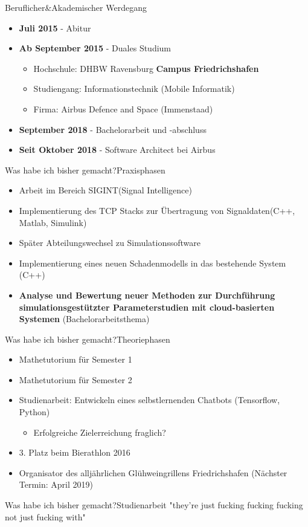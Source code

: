 	\begin{frame}{Beruflicher\&Akademischer Werdegang}{}
		\begin{itemize}
			\item \textbf{Juli 2015} - Abitur
			\item \textbf{Ab September 2015} - Duales Studium
			\begin{itemize}
				\item Hochschule: DHBW Ravensburg \textbf{Campus Friedrichshafen}
				\item Studiengang: Informationstechnik (Mobile Informatik)
				\item Firma: Airbus Defence and Space (Immenstaad)
			\end{itemize}
			\item \textbf{September 2018} - Bachelorarbeit und -abschluss
			\item \textbf{Seit Oktober 2018} - Software Architect bei Airbus
		\end{itemize}
	\end{frame}
	
	\begin{frame}{Was habe ich bisher gemacht?}{Praxisphasen}
			\begin{itemize}
				\item Arbeit im Bereich SIGINT(Signal Intelligence)
				\item Implementierung des TCP Stacks zur Übertragung von Signaldaten(C++, Matlab, Simulink)
				\item Später Abteilungswechsel zu Simulationssoftware
				\item Implementierung eines neuen Schadenmodells in das bestehende System (C++)
				\item \textbf{Analyse und Bewertung neuer Methoden zur Durchführung simulationsgestützter Parameterstudien mit cloud-basierten Systemen} (Bachelorarbeitsthema)
			\end{itemize}
	\end{frame}
	
	\begin{frame}{Was habe ich bisher gemacht?}{Theoriephasen}
		\begin{itemize}
			\item Mathetutorium für Semester 1
			\item Mathetutorium für Semester 2
			\item Studienarbeit: Entwickeln eines selbstlernenden Chatbots (Tensorflow, Python)
			\begin{itemize}
				\item Erfolgreiche Zielerreichung fraglich?
			\end{itemize}
			\item 3. Platz beim Bierathlon 2016
			\item Organisator des alljährlichen Glühweingrillens Friedrichshafen (Nächster Termin: April 2019)
		\end{itemize}
	\end{frame}
	
	\begin{frame}{Was habe ich bisher gemacht?}{Studienarbeit}
		"they're just fucking fucking fucking not just fucking with"
	\end{frame}